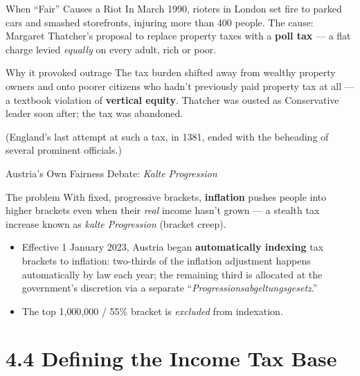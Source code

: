 \documentclass[11pt,aspectratio=169]{beamer}
\begin{document}
\begin{frame}{When ``Fair'' Causes a Riot}
  \small
  In March 1990, rioters in London set fire to parked cars and smashed storefronts, injuring more than 400 people. The cause: Margaret Thatcher's proposal to replace property taxes with a \textbf{poll tax} --- a flat charge levied \emph{equally} on every adult, rich or poor.
  \vspace{0.3em}
  \begin{alertblock}{Why it provoked outrage}
    The tax burden shifted away from wealthy property owners and onto poorer citizens who hadn't previously paid property tax at all --- a textbook violation of \textbf{vertical equity}. Thatcher was ousted as Conservative leader soon after; the tax was abandoned.
  \end{alertblock}
  \vspace{0.3em}
 
  (England's last attempt at such a tax, in 1381, ended with the beheading of several prominent officials.)\\

\end{frame}

\begin{frame}{Austria's Own Fairness Debate: \emph{Kalte Progression}}
  \footnotesize
  \begin{block}{The problem}
    With fixed, progressive brackets, \textbf{inflation} pushes people into higher brackets even when their \emph{real} income hasn't grown --- a stealth tax increase known as \emph{kalte Progression} (bracket creep).
  \end{block}
  \vspace{0.3em}
  \begin{itemize}
    \item Effective 1 January 2023, Austria began \textbf{automatically indexing} tax brackets to inflation: two-thirds of the inflation adjustment happens automatically by law each year; the remaining third is allocated at the government's discretion via a separate ``\emph{Progressionsabgeltungsgesetz}.''
    \item The top \texteuro{}1{,}000{,}000 / 55\% bracket is \emph{excluded} from indexation.
  \end{itemize}
 
 
 \end{frame}

\section{4.4 Defining the Income Tax Base}
\end{document}
